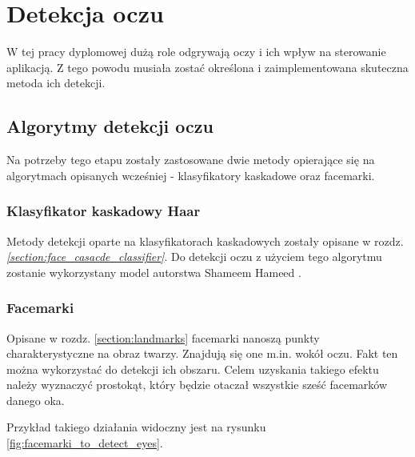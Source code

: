 \newpage

\section{Detekcja oczu} \label{section:eye_detection}

W tej pracy dyplomowej dużą role odgrywają oczy i ich wpływ na sterowanie aplikacją. Z tego powodu musiała zostać określona i zaimplementowana skuteczna metoda ich detekcji.



\subsection{Algorytmy detekcji oczu}

Na potrzeby tego etapu zostały zastosowane dwie metody opierające się na algorytmach opisanych wcześniej - klasyfikatory kaskadowe oraz facemarki.

\subsubsection{Klasyfikator kaskadowy Haar}

Metody detekcji oparte na klasyfikatorach kaskadowych zostały opisane w rozdz. \hyperref[{section:face_casacde_classifier}]{\textit{\ref{section:face_casacde_classifier}}}. Do detekcji oczu z użyciem tego algorytmu zostanie wykorzystany model autorstwa Shameem Hameed \cite{eye_haar_model}.

\subsubsection{Facemarki}

Opisane w rozdz. \hyperref[section:landmarks]{\ref{section:landmarks}} facemarki nanoszą punkty charakterystyczne na obraz twarzy. Znajdują się one m.in. wokół oczu. Fakt ten można wykorzystać do detekcji ich obszaru. Celem uzyskania takiego efektu należy wyznaczyć prostokąt, który będzie otaczał wszystkie sześć facemarków danego oka. \cite{detect_eye_facemarks}
\par
Przykład takiego działania widoczny jest na rysunku \ref{fig:facemarki_to_detect_eyes}.

